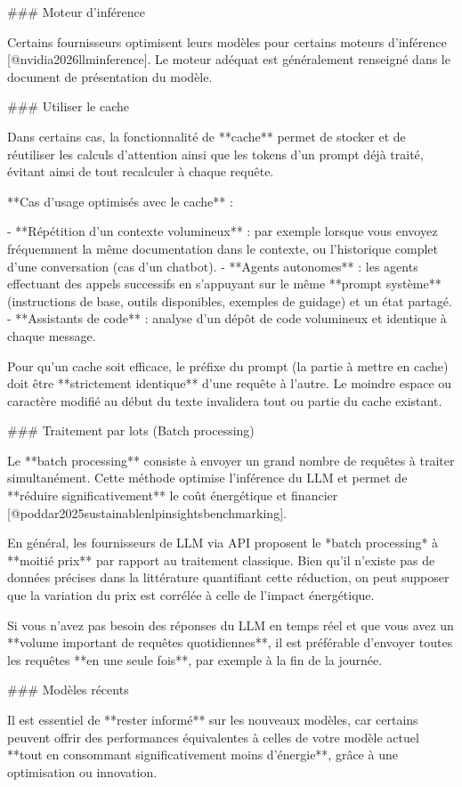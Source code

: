 {### Moteur d'inférence

Certains fournisseurs optimisent leurs modèles pour certains moteurs d'inférence [@nvidia2026llminference]. Le moteur adéquat est généralement renseigné dans le document de présentation du modèle.

### Utiliser le cache

Dans certains cas, la fonctionnalité de **cache** permet de stocker et de réutiliser les calculs d'attention ainsi que les tokens d'un prompt déjà traité, évitant ainsi de tout recalculer à chaque requête.

**Cas d'usage optimisés avec le cache** :

- **Répétition d'un contexte volumineux** : par exemple lorsque vous envoyez fréquemment la même documentation dans le contexte, ou l'historique complet d'une conversation (cas d'un chatbot).
- **Agents autonomes** : les agents effectuant des appels successifs en s'appuyant sur le même **prompt système** (instructions de base, outils disponibles, exemples de guidage) et un état partagé.
- **Assistants de code** : analyse d'un dépôt de code volumineux et identique à chaque message.

Pour qu'un cache soit efficace, le préfixe du prompt (la partie à mettre en cache) doit être **strictement identique** d'une requête à l'autre. Le moindre espace ou caractère modifié au début du texte invalidera tout ou partie du cache existant.

### Traitement par lots (Batch processing)

Le **batch processing** consiste à envoyer un grand nombre de requêtes à traiter simultanément. Cette méthode optimise l'inférence du LLM et permet de **réduire significativement** le coût énergétique et financier [@poddar2025sustainablenlpinsightsbenchmarking].

En général, les fournisseurs de LLM via API proposent le *batch processing* à **moitié prix** par rapport au traitement classique. Bien qu'il n'existe pas de données précises dans la littérature quantifiant cette réduction, on peut supposer que la variation du prix est corrélée à celle de l'impact énergétique.

Si vous n'avez pas besoin des réponses du LLM en temps réel et que vous avez un **volume important de requêtes quotidiennes**, il est préférable d'envoyer toutes les requêtes **en une seule fois**, par exemple à la fin de la journée.

### Modèles récents

Il est essentiel de **rester informé** sur les nouveaux modèles, car certains peuvent offrir des performances équivalentes à celles de votre modèle actuel **tout en consommant significativement moins d'énergie**, grâce à une optimisation ou innovation.

}
